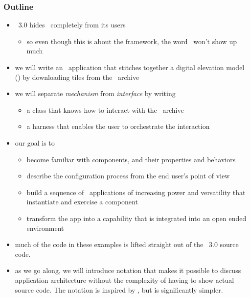 \begin{frame}
%
  \frametitle{Outline}
%
  \begin{itemize}
%
  \item \isce\ 3.0 hides \pyre\ completely from its users
    \begin{itemize}
    \item so even though this is about the framework, the word \pyre\ won't show up much
    \end{itemize}
%
  \item we will write an \isce\ application that stitches together a digital elevation model
    (\dem) by downloading tiles from the \srtm\ archive
%
  \item we will separate \emph{mechanism} from \emph{interface} by writing
    \begin{itemize}
    \item a class that knows how to interact with the \srtm\ archive
    \item a harness that enables the user to orchestrate the interaction
    \end{itemize}
%
  \item our goal is to
    \begin{itemize}
    \item become familiar with components, and their properties and behaviors
    \item describe the configuration process from the end user's point of view
    \item build a sequence of \isce\ applications of increasing power and versatility that
      instantiate and exercise a component
    \item transform the app into a capability that is integrated into an open ended environment
    \end{itemize}
%
  \item much of the code in these examples is lifted straight out of the \isce\ 3.0 source
    code.
%
  \item as we go along, we will introduce notation that makes it possible to discuss
    application architecture without the complexity of having to show actual source code. The
    notation is inspired by \uml\supercite{uml-99,uml-05}, but is significantly simpler.
%
  \end{itemize}
%
\end{frame}

